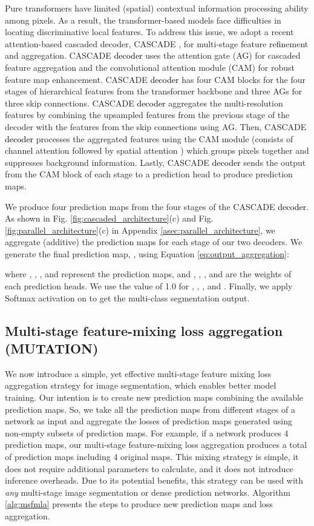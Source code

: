 \documentclass{midl}
\begin{document}
Pure transformers have limited (spatial) contextual information processing ability among pixels. As a result, the transformer-based models face difficulties in locating discriminative local features. To address this issue, we adopt a recent attention-based cascaded decoder, CASCADE \cite{rahman2023medical}, for multi-stage feature refinement and aggregation. CASCADE \textcolor{black}{decoder} uses the attention gate (AG) \cite{oktay2018attention} for cascaded feature aggregation and the convolutional attention module (CAM) for robust feature map enhancement. CASCADE \textcolor{black}{decoder} has four CAM blocks for the four stages of hierarchical features from the transformer backbone and three AGs for three skip connections. CASCADE \textcolor{black}{decoder} aggregates the multi-resolution features by combining the upsampled features from the previous stage of the decoder with the features from the skip connections using AG. Then, CASCADE \textcolor{black}{decoder} processes the aggregated features using the CAM module (consists of channel attention \cite{hu2018squeeze} followed by spatial attention \cite{chen2017sca}) which groups pixels together and suppresses background information. Lastly, CASCADE \textcolor{black}{decoder} sends the output from the CAM block of each stage to a prediction head to produce prediction maps. 

We produce four prediction maps from the four stages of the CASCADE \textcolor{black}{decoder}. As shown in Fig. \ref{fig:cascaded_architecture}(c) and Fig. \ref{fig:parallel_architecture}(c) in Appendix \ref{asec:parallel_architecture}, we aggregate (additive) the prediction maps for each stage of our two decoders. We generate the final prediction map, , using Equation \ref{eq:output_aggregation}:

where , , , and  represent the prediction maps, and , , , and  are the weights of each prediction heads. We use the value of 1.0 for , , , and . Finally, we apply Softmax activation on  to get the multi-class segmentation output.

\subsection{Multi-stage feature-mixing loss aggregation (MUTATION)}
We now introduce a simple, yet effective multi-stage feature mixing loss aggregation strategy for image segmentation, which enables better model training. Our intention is to create new prediction maps combining the available prediction maps. So, we take all the prediction maps from different stages of a network as input and aggregate the losses of prediction maps generated using  non-empty subsets of  prediction maps. For example, if a network produces 4 prediction maps, our multi-stage feature-mixing loss aggregation produces a total of  prediction maps including 4 original maps. This mixing strategy is simple, it does not require additional parameters to calculate, and it does not introduce inference overheads. Due to its potential benefits, this strategy can be used with \textit{any} multi-stage image segmentation or dense prediction networks. Algorithm \ref{alg:msfmla} presents the steps to produce new prediction maps and loss aggregation.   
\end{document}
